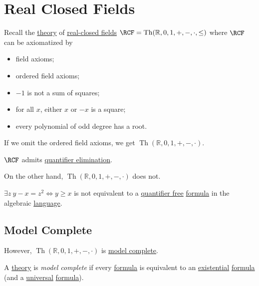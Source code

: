 \section{Real Closed Fields}
Recall the \hyperref[def:theory]{theory} of \hyperref[prev:real-closed-field]{real-closed fields} \(\RCF = \mathop{\mathrm{Th}}(\mathbb{R} , 0, 1, +, -, \cdot, \leq )\) where \(\RCF\) can be axiomatized by
\begin{itemize}
	\item field axioms;
	\item ordered field axioms;
	\item \(-1\) is not a sum of squares;
	\item for all \(x\), either \(x\) or \(-x\) is a square;
	\item every polynomial of odd degree has a root.
\end{itemize}

\begin{remark}
	If we omit the ordered field axioms, we get \(\mathop{\mathrm{Th}}(\mathbb{R} , 0, 1, +, -, \cdot) \).
\end{remark}

\begin{theorem}\label{thm:RCF-QE}
	\(\RCF\) admits \hyperref[def:quantifier-elimination]{quantifier elimination}.
\end{theorem}

On the other hand, \(\mathop{\mathrm{Th}}(\mathbb{R} , 0, 1, +, -, \cdot) \) does not.

\begin{eg}
	\(\exists z\ y - x = z^2 \iff y \geq x\) is not equivalent to a \hyperref[not:quantifier-free]{quantifier free} \hyperref[def:formula]{formula} in the algebraic \hyperref[def:language]{language}.
\end{eg}

\subsection{Model Complete}
However, \(\mathop{\mathrm{Th}}(\mathbb{R} , 0, 1, +, -, \cdot) \) is \hyperref[def:model-complete]{model complete}.

\begin{definition}\label{def:model-complete}
	A \hyperref[def:theory]{theory} is \emph{model complete} if every \hyperref[def:formula]{formula} is equivalent to an \hyperref[not:existential]{existential} \hyperref[def:formula]{formula} (and a \hyperref[not:universal]{universal} \hyperref[def:formula]{formula}).
\end{definition}

